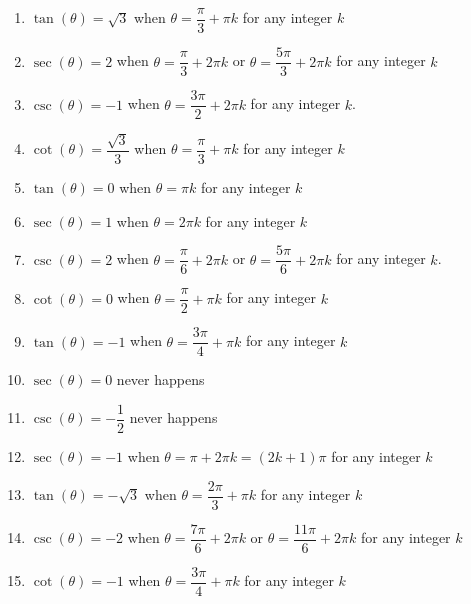\begin{enumerate}

\setcounter{enumi}{\value{HW}}

\item $\tan(\theta) = \sqrt{3}$ when $\theta = \dfrac{\pi}{3} + \pi k$ for any integer $k$
\item $\sec(\theta) = 2$ when $\theta = \dfrac{\pi}{3} + 2\pi k$ or $\theta = \dfrac{5\pi}{3} + 2\pi k$ for any integer $k$
\item $\csc(\theta) = -1$ when $\theta = \dfrac{3\pi}{2} + 2\pi k$ for any integer $k$.
\item $\cot(\theta) = \dfrac{\sqrt{3}}{3}$ when $\theta = \dfrac{\pi}{3} + \pi k$ for any integer $k$
\item $\tan(\theta) = 0$ when $\theta = \pi k$ for any integer $k$
\item $\sec(\theta) = 1$ when $\theta = 2\pi k$ for any integer $k$
\item $\csc(\theta) = 2$ when $\theta = \dfrac{\pi}{6} + 2\pi k$ or $\theta = \dfrac{5\pi}{6} + 2\pi k$ for any integer $k$.
\item $\cot(\theta) = 0$ when $\theta = \dfrac{\pi}{2} + \pi k$ for any integer $k$
\item $\tan(\theta) = -1$ when $\theta = \dfrac{3\pi}{4} + \pi k$ for any integer $k$
\item $\sec(\theta) = 0$ never happens 
\item $\csc(\theta) = -\dfrac{1}{2}$ never happens
\item  $\sec(\theta) = -1$ when $\theta = \pi + 2\pi k = (2k+1)\pi$ for any integer $k$
\item  $\tan(\theta) = -\sqrt{3}$ when $\theta = \dfrac{2\pi}{3} + \pi k$ for any integer $k$
\item  $\csc(\theta) = -2$ when $\theta = \dfrac{7\pi}{6} + 2\pi k$ or $\theta = \dfrac{11\pi}{6} + 2\pi k$ for any integer $k$
\item  $\cot(\theta) = -1$ when $\theta = \dfrac{3\pi}{4} + \pi k$ for any integer $k$

\setcounter{HW}{\value{enumi}}

\end{enumerate}

